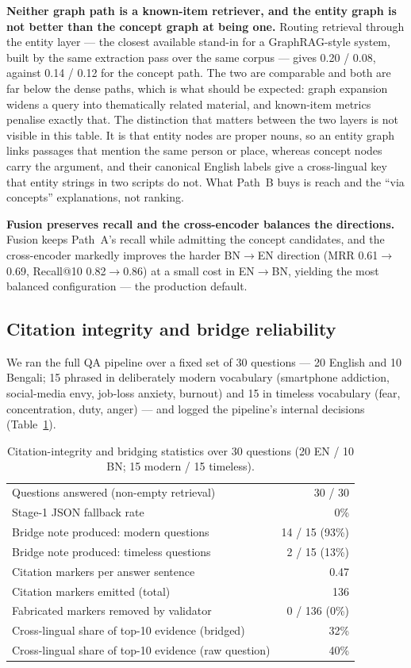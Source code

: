 \documentclass[11pt,a4paper]{article}
\begin{document}
\textbf{Neither graph path is a known-item retriever, and the entity graph
is not better than the concept graph at being one.} Routing retrieval
through the entity layer --- the closest available stand-in for a
GraphRAG-style system, built by the same extraction pass over the same
corpus --- gives 0.20 / 0.08, against 0.14 / 0.12 for the concept path. The
two are comparable and both are far below the dense paths, which is what
should be expected: graph expansion widens a query into thematically
related material, and known-item metrics penalise exactly that. The
distinction that matters between the two layers is not visible in this
table. It is that entity nodes are proper nouns, so an entity graph links
passages that mention the same person or place, whereas concept nodes carry
the argument, and their canonical English labels give a cross-lingual key
that entity strings in two scripts do not. What Path~B buys is reach and
the ``via concepts'' explanations, not ranking.

\textbf{Fusion preserves recall and the cross-encoder balances the
directions.} Fusion keeps Path~A's recall while admitting the concept
candidates, and the cross-encoder markedly improves the harder BN$\to$EN
direction (MRR 0.61$\to$0.69, Recall@10 0.82$\to$0.86) at a small cost in
EN$\to$BN, yielding the most balanced configuration --- the production
default.

\subsection{Citation integrity and bridge reliability}
\label{sec:eval-integrity}

We ran the full QA pipeline over a fixed set of 30 questions --- 20
English and 10 Bengali; 15 phrased in deliberately modern vocabulary
(smartphone addiction, social-media envy, job-loss anxiety, burnout) and
15 in timeless vocabulary (fear, concentration, duty, anger) --- and
logged the pipeline's internal decisions (Table~\ref{tab:integrity}).

\begin{table}[t]
\centering
\caption{Citation-integrity and bridging statistics over 30 questions
(20 EN / 10 BN; 15 modern / 15 timeless).}
\label{tab:integrity}
\begin{tabular}{lr}
\toprule
Questions answered (non-empty retrieval) & 30 / 30\\
Stage-1 JSON fallback rate & 0\%\\
Bridge note produced: modern questions & 14 / 15 (93\%)\\
Bridge note produced: timeless questions & 2 / 15 (13\%)\\
Citation markers per answer sentence & 0.47\\
Citation markers emitted (total) & 136\\
Fabricated markers removed by validator & 0 / 136 (0\%)\\
Cross-lingual share of top-10 evidence (bridged) & 32\%\\
Cross-lingual share of top-10 evidence (raw question) & 40\%\\
\bottomrule
\end{tabular}
\end{table}
\end{document}

